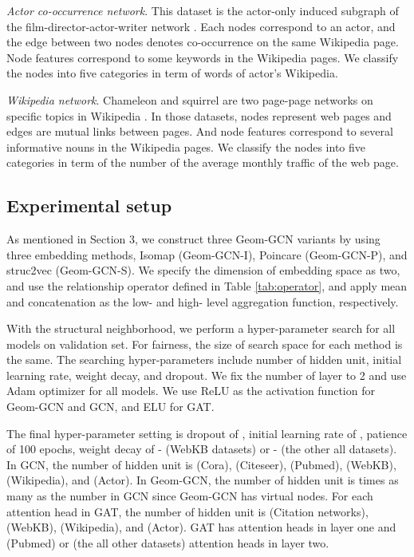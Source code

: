 \documentclass{article} \usepackage{iclr2020_conference,times}
\begin{document}
\emph{Actor co-occurrence network}.
This dataset is the actor-only induced subgraph of the film-director-actor-writer network \citep{tang2009social}. 
Each nodes correspond to an actor, and the edge between two nodes denotes co-occurrence on the same Wikipedia page.
Node features correspond to some keywords in the Wikipedia pages.
We classify the nodes into five categories in term of words of actor's Wikipedia.

\emph{Wikipedia network}.
Chameleon and squirrel are two page-page networks on specific topics in Wikipedia \citep{rozemberczki2019multi}.
In those datasets, nodes represent web pages and edges are mutual links between pages. 
And node features correspond to several informative nouns in the Wikipedia pages.
We classify the nodes into five categories in term of the number of the average monthly traffic of the web page.

\subsection{Experimental setup}
\vspace{-2mm}
As mentioned in Section 3, we construct three Geom-GCN variants by using three embedding methods, Isomap (Geom-GCN-I), Poincare   (Geom-GCN-P), and struc2vec  (Geom-GCN-S).
We specify the dimension of embedding space as two, and use the relationship operator  defined in Table \ref{tab:operator}, and apply mean and concatenation as the low- and high- level aggregation function, respectively.

With the structural neighborhood, we perform a hyper-parameter search for all models on validation set.
For fairness, the size of search space for each method is the same. 
The searching hyper-parameters include number of hidden unit, initial learning rate, weight decay, and dropout. 
We fix the number of layer to 2 and use Adam optimizer \citep{kingma2014adam} for all models. 
We use ReLU as the activation function for Geom-GCN and GCN, and ELU for GAT.

The final hyper-parameter setting is dropout of , initial learning rate of , patience of 100 epochs, weight decay of - (WebKB datasets) or - (the other all datasets).
In GCN, the number of hidden unit is  (Cora),  (Citeseer),  (Pubmed),  (WebKB),  (Wikipedia), and  (Actor). 
In Geom-GCN,  the number of hidden unit is  times as many as the number in GCN since Geom-GCN has   virtual nodes.
For each attention head in GAT, the number of hidden unit is  (Citation networks),  (WebKB),  (Wikipedia), and  (Actor). 
GAT has  attention heads in layer one and  (Pubmed) or  (the all other datasets) attention heads in layer two.
\end{document}
